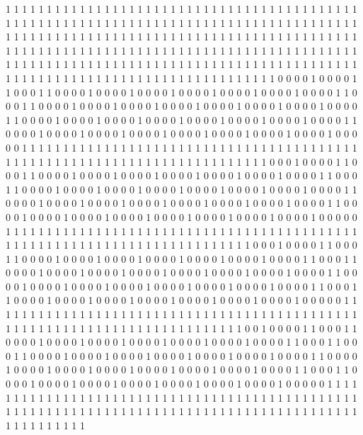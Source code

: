 1 1 1 1 1 1 1 1 1 1 1 1 1 1 1 1 1 1 1 1
1 1 1 1 1 1 1 1 1 1 1 1 1 1 1 1 1 1 1 1
1 1 1 1 1 1 1 1 1 1 1 1 1 1 1 1 1 1 1 1
1 1 1 1 1 1 1 1 1 1 1 1 1 1 1 1 1 1 1 1
1 1 1 1 1 1 1 1 1 1 1 1 1 1 1 1 1 1 1 1
1 1 1 1 1 1 1 1 1 1 1 1 1 1 1 1 1 1 1 1
1 1 1 1 1 1 1 1 1 1 1 1 1 1 1 1 1 1 1 1
1 1 1 1 1 1 1 1 1 1 1 1 1 1 1 1 1 1 1 1
1 1 1 1 1 1 1 1 1 1 1 1 1 1 1 1 1 1 1 1
1 1 1 1 1 1 1 1 1 1 1 1 1 1 1 1 1 1 1 1
1 1 1 1 1 1 1 1 1 1 1 1 1 1 1 1 1 1 1 1
1 1 1 1 1 1 1 1 1 1 1 1 1 1 1 1 1 1 1 1
1 1 1 1 1 1 1 1 0 0 0 0 1 0 0 0 0 1 1 0
0 0 1 1 0 0 0 0 1 0 0 0 0 1 0 0 0 0 1 0
0 0 0 1 0 0 0 0 1 0 0 0 0 1 0 0 0 0 1 1
0 0 0 1 1 0 0 0 0 1 0 0 0 0 1 0 0 0 0 1
0 0 0 0 1 0 0 0 0 1 0 0 0 0 1 0 0 0 0 1
0 0 0 0 1 1 0 0 0 0 1 0 0 0 0 1 0 0 0 0
1 0 0 0 0 1 0 0 0 0 1 0 0 0 0 1 0 0 0 0
1 0 0 0 0 1 1 0 0 0 0 1 0 0 0 0 1 0 0 0
0 1 0 0 0 0 1 0 0 0 0 1 0 0 0 0 1 0 0 0
0 1 0 0 0 0 1 0 0 0 0 0 1 1 1 1 1 1 1 1
1 1 1 1 1 1 1 1 1 1 1 1 1 1 1 1 1 1 1 1
1 1 1 1 1 1 1 1 1 1 1 1 1 1 1 1 1 1 1 1
1 1 1 1 1 1 1 1 1 1 1 1 1 1 1 1 1 1 1 1
1 1 1 1 1 0 0 0 1 0 0 0 0 1 1 0 0 0 1 1
0 0 0 0 1 0 0 0 0 1 0 0 0 0 1 0 0 0 0 1
0 0 0 0 1 0 0 0 0 1 0 0 0 0 1 1 0 0 0 1
1 0 0 0 0 1 0 0 0 0 1 0 0 0 0 1 0 0 0 0
1 0 0 0 0 1 0 0 0 0 1 0 0 0 0 1 0 0 0 0
1 1 0 0 0 0 1 0 0 0 0 1 0 0 0 0 1 0 0 0
0 1 0 0 0 0 1 0 0 0 0 1 0 0 0 0 1 0 0 0
0 1 1 0 0 0 0 1 0 0 0 0 1 0 0 0 0 1 0 0
0 0 1 0 0 0 0 1 0 0 0 0 1 0 0 0 0 1 0 0
0 0 1 0 0 0 0 0 1 1 1 1 1 1 1 1 1 1 1 1
1 1 1 1 1 1 1 1 1 1 1 1 1 1 1 1 1 1 1 1
1 1 1 1 1 1 1 1 1 1 1 1 1 1 1 1 1 1 1 1
1 1 1 1 1 1 1 1 1 1 1 1 1 1 1 1 1 1 1 1
1 0 0 0 1 0 0 0 0 1 1 0 0 0 1 1 0 0 0 0
1 0 0 0 0 1 0 0 0 0 1 0 0 0 0 1 0 0 0 0
1 0 0 0 0 1 0 0 0 0 1 1 0 0 0 1 1 0 0 0
0 1 0 0 0 0 1 0 0 0 0 1 0 0 0 0 1 0 0 0
0 1 0 0 0 0 1 0 0 0 0 1 0 0 0 0 1 1 0 0
0 0 1 0 0 0 0 1 0 0 0 0 1 0 0 0 0 1 0 0
0 0 1 0 0 0 0 1 0 0 0 0 1 0 0 0 0 1 1 0
0 0 1 1 0 0 0 0 1 0 0 0 0 1 0 0 0 0 1 0
0 0 0 1 0 0 0 0 1 0 0 0 0 1 0 0 0 0 1 0
0 0 0 0 1 1 1 1 1 1 1 1 1 1 1 1 1 1 1 1
1 1 1 1 1 1 1 1 1 1 1 1 1 1 1 1 1 1 1 1
1 1 1 1 1 1 1 1 1 1 1 1 1 1 1 1 1 1 1 1
1 1 1 1 1 1 1 1 1 1 1 1 1 1 1 1 1 1 0 0
1 0 0 0 0 1 1 0 0 0 1 1 0 0 0 0 1 0 0 0
0 1 0 0 0 0 1 0 0 0 0 1 0 0 0 0 1 0 0 0
0 1 0 0 0 0 1 1 0 0 0 1 1 0 0 0 1 1 0 0
0 0 1 0 0 0 0 1 0 0 0 0 1 0 0 0 0 1 0 0
0 0 1 0 0 0 0 1 0 0 0 0 1 1 0 0 0 0 1 0
0 0 0 1 0 0 0 0 1 0 0 0 0 1 0 0 0 0 1 0
0 0 0 1 0 0 0 0 1 0 0 0 0 1 1 0 0 0 1 1
0 0 0 0 1 0 0 0 0 1 0 0 0 0 1 0 0 0 0 1
0 0 0 0 1 0 0 0 0 1 0 0 0 0 1 0 0 0 0 0
1 1 1 1 1 1 1 1 1 1 1 1 1 1 1 1 1 1 1 1
1 1 1 1 1 1 1 1 1 1 1 1 1 1 1 1 1 1 1 1
1 1 1 1 1 1 1 1 1 1 1 1 1 1 1 1 1 1 1 1
1 1 1 1 1 1 1 1 1 1 1 1 1 1 1 1 1 1 1 1
1 1 1 1 1 1 1 1 1 1 1 1 1 1 1 1 1 1 1 1
